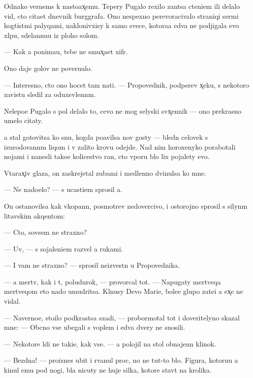 \documentclass[10pt]{book}
\begin{document}
Odnako vernems{\ia} k nasto{\y}ax̨emu. Tepery Pugalo rexilo zan{\ia}tsa cteni{\y}em ili delalo vid, cto cita{\y}et dnevnik burggrafa. Ono nespexno perevoracivalo straniqi ser{\yi}mi kogtist{\yi}mi palyqami, naklonivxisy k samo{\y} svece, kotora{\y}a {\y}edva ne podjigala {\y}evo xl{\ia}pu, sdelannu{\y}u iz ploho{\y} solom{\yi}.

— Kak {\y}a ponima{\y}u, tebe ne smux̨a{\y}et xifr.

Ono daje golov{\yi} ne povernulo.

— Interesno, cto ono hocet tam na{\y}ti. — Propovednik, podperev x̨eku, s nekotoro{\y} zavist{\y}u sledil za oduxevlenn{\yi}m.

Nelepo{\y}e Pugalo s pol{\ia} delalo to, cevo ne mog selyski{\y} sv{\ia}x̨ennik — ono prekrasno umelo citaty.

{\Y}a stal gotovitsa ko snu, kogda po{\y}avilsa nov{\yi}{\y} gosty — bledn{\yi}{\y} celovek s izurodovann{\yi}m liqom i v zalito{\y} krov{\y}u odejde. Nad nim horoxenyko porabotali nojami i nanesli tako{\y}e kolicestvo ran, cto vporu b{\yi}lo lix pojalety {\y}evo.

V{\yi}tarax̨iv glaza, on zaskrejetal zubami i medlenno dvinulsa ko mne.

— Ne nado{\y}elo? — s ucasti{\y}em sprosil {\y}a.

On ostanovilsa kak vkopann{\yi}{\y}, posmotrev nedovercivo, i ostorojno sprosil s silyn{\yi}m litavskim akqentom:

— Cto, sovsem ne straxno?

— Uv{\yi}, — s sojaleni{\y}em razvel {\y}a rukami.

— I vam ne straxno? — sprosil ne{\y}izvestn{\yi}{\y} u Propovednika.

— {\Y}a mertv, kak i t{\yi}, poludurok, — provorcal tot. — Napugaty mertveqa mertveqom eto nado umudritsa. Kl{\ia}nusy Devo{\y} Mari{\y}e{\y}, bole{\y}e glupo{\y} zate{\y}i {\y}a {\y}ex̨e ne vidal.

— Naverno{\y}e, sto{\y}ilo podkrastsa szadi, — probormotal tot i doveritelyno skazal mne: — Ob{\yi}cno vse ubegali s voplem i {\y}edva dvery ne snosili.

— Nekotor{\yi}{\y}e l{\iu}di ne taki{\y}e, kak vse. — {\Y}a polojil na stol obnajenn{\yi}{\y} klinok.

— Bezdna! — pro{\y}iznes ubit{\yi}{\y} i rvanul proc, no ne tut-to b{\yi}lo. Figura, kotoru{\y}u {\y}a kinul {\y}emu pod nogi, b{\yi}la nicuty ne huje silka, kotor{\yi}{\y}e stav{\ia}t na krolika.
\end{document}
